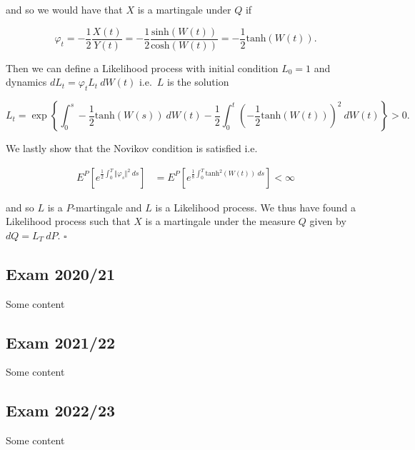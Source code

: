 \documentclass[
]{article}
\begin{document}
and so we would have that \(X\) is a martingale under \(Q\) if

\[
\varphi_t=-\frac{1}{2}\frac{X(t)}{Y(t)}=-\frac{1}{2}\frac{\text{sinh}(W(t))}{\text{cosh}(W(t))}=-\frac{1}{2}\text{tanh}(W(t)).
\]

Then we can define a Likelihood process with initial condition \(L_0=1\)
and dynamics \(dL_t=\varphi_tL_t\ dW(t)\) i.e.~\(L\) is the solution

\[
L_t=\exp\left\{\int_0^s-\frac{1}{2}\text{tanh}(W(s)) \ dW(t)-\frac{1}{2}\int_0^t\left(-\frac{1}{2}\text{tanh}(W(t))\right)^2 \ dW(t)\right\}> 0.
\]

We lastly show that the Novikov condition is satisfied i.e.

\begin{align*}
E^P\left[e^{\frac{1}{2}\int_0^T\Vert \varphi_s\Vert^2\ ds}\right]&=E^P\left[e^{\frac{1}{8}\int_0^T\text{tanh}^2(W(t))\ ds}\right]<\infty
\end{align*}

and so \(L\) is a \(P\)-martingale and \(L\) is a Likelihood process. We
thus have found a Likelihood process such that \(X\) is a martingale
under the measure \(Q\) given by \(dQ=L_T\ dP\). \(\square\)

\hypertarget{exam-202021}{%
\subsection{Exam 2020/21}\label{exam-202021}}

Some content

\hypertarget{exam-202122}{%
\subsection{Exam 2021/22}\label{exam-202122}}

Some content

\hypertarget{exam-202223}{%
\subsection{Exam 2022/23}\label{exam-202223}}

Some content
\end{document}

